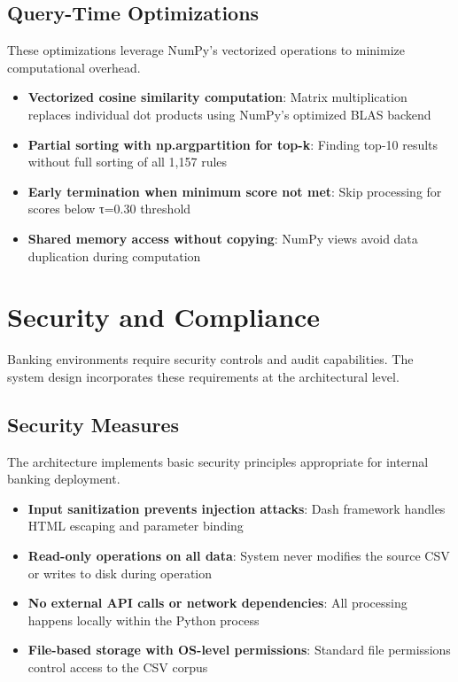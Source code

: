 \subsection{Query-Time Optimizations}

These optimizations leverage NumPy's vectorized operations to minimize computational overhead.

\begin{itemize}[leftmargin=*,itemsep=3pt,topsep=3pt]
  \item \textbf{Vectorized cosine similarity computation}: Matrix multiplication replaces individual dot products using NumPy's optimized BLAS backend
  \item \textbf{Partial sorting with np.argpartition for top-k}: Finding top-10 results without full sorting of all 1,157 rules
  \item \textbf{Early termination when minimum score not met}: Skip processing for scores below τ=0.30 threshold
  \item \textbf{Shared memory access without copying}: NumPy views avoid data duplication during computation
\end{itemize}

\section{Security and Compliance}

Banking environments require security controls and audit capabilities. The system design incorporates these requirements at the architectural level.

\subsection{Security Measures}

The architecture implements basic security principles appropriate for internal banking deployment.

\begin{itemize}[leftmargin=*,itemsep=3pt,topsep=3pt]
  \item \textbf{Input sanitization prevents injection attacks}: Dash framework handles HTML escaping and parameter binding
  \item \textbf{Read-only operations on all data}: System never modifies the source CSV or writes to disk during operation
  \item \textbf{No external API calls or network dependencies}: All processing happens locally within the Python process
  \item \textbf{File-based storage with OS-level permissions}: Standard file permissions control access to the CSV corpus
\end{itemize}

